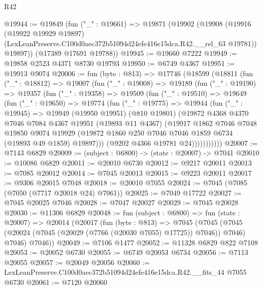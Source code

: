\begin{lexlean}{R42}
\begin{coremodule}
{@19944 := @19849
    (fun ("_" : @19661) =>
    @19871
      (@19902
        (@19908
          (@19916
            (@19922 @19929 @19897)
            (LexLeanPreserve.C100d0aec372b51094d24efe416e15dca.R42.__rel_63 @19781))
          @19897))
      (@17389 @17691 @19788))
@19945 := @19660 @7222
@19949 := @19858 @2523 @4371 @8730 @19793
@19950 := @6749 @4367
@19951 := @19913 @9074
@20006 := fun (byte : @813) =>
  @17746
    (@18599
      (@18811
        (fun ("_" : @18812) =>
        @19007
          (fun ("_" : @19008) =>
          @19189
            (fun ("_" : @19190) =>
            @19357
              (fun ("_" : @19358) =>
              @19509
                (fun ("_" : @19510) =>
                @19649
                  (fun ("_" : @19650) =>
                  @19774
                    (fun ("_" : @19775) =>
                    @19944
                      (fun ("_" : @19945) =>
                      @19949
                        (@19950 @19951)
                        (@810 @19801)
                        (@19872
                          @4368
                          @4370
                          @7046
                          @7084
                          @4367
                          @19951
                          (@19893 @11 @4367)
                          (@19917
                            @1862
                            @7046
                            @7048
                            @19850
                            @9074
                            @19929
                            (@19872 @1860 @250 @7046 @7046 @1859 @6734 (@19893 @49 @1859) @19897)))
                        (@9202 @4366 @19781 @24)))))))))))
@20007 := @7143 @6829
@20009 := (subject : @6800) -> (state : @20007) -> @7041
@20010 := @10086 @6829
@20011 := @20010 @6730
@20012 := @9217 @20011
@20013 := @7085 @20012
@20014 := @7045 @20013
@20015 := @9223 @20011
@20017 := @9306 @20015 @7048
@20018 := @20010 @7055
@20024 := @7045 (@7085 (@7050 (@7717 @20018 @24) @7061))
@20025 := @7049 @17722
@20027 := @7045 @20025 @7046
@20028 := @7047 @20027
@20029 := @7045 @20028
@20030 := @11306 @6829
@20048 := fun (subject : @6800) =>
  fun (state : @20007) =>
  @20014
    (@20017
      (fun (byte : @813) =>
      @7045
        (@7045 (@7045 (@20024 (@7045 (@20029 (@7766 (@20030 @7055) @17725)) @7046)) @7046) @7046)
        @7046))
@20049 := @7106 @1477
@20052 := @11328 @6829 @822 @7108
@20053 := @20052 @6730
@20055 := @6749 @20053 @6734
@20056 := @7113 @20055
@20057 := @20049 @20056
@20060 := LexLeanPreserve.C100d0aec372b51094d24efe416e15dca.R42.__fits_44 @7055 @6730
@20061 := @7120 @20060
}
\end{coremodule}
\end{lexlean}
